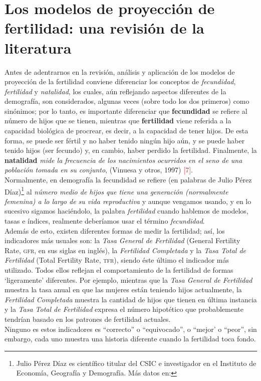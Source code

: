 \section{Los modelos de proyección de fertilidad: una revisión de la literatura} %

Antes de adentrarnos en la revisión, análisis y aplicación de los modelos de proyección de la fertilidad conviene diferenciar los conceptos de \textit{fecundidad}, \textit{fertilidad} y \textit{natalidad}, los cuales, aún reflejando aspectos diferentes de la demografía, son considerados, algunas veces (sobre todo los dos primeros) como sinónimos; por lo tanto, es importante diferenciar que \textbf{fecundidad} se refiere al número de hijos que se tienen, mientras que \textbf{fertilidad} viene referida a la capacidad biológica de procrear, es decir, a la capacidad de tener hijos. De esta forma, se puede ser fértil y no haber tenido ningún hijo aún, y se puede haber tenido hijos (ser fecundo) y, en cambio, haber perdido la fertilidad. Finalmente, la \textbf{natalidad} \textit{mide la frecuencia de los nacimientos ocurridos en el seno de una población tomada en su conjunto}, (Vinuesa y otros, 1997) \textcolor{red}{[7]}.\\
Normalmente, en demografía la fecundidad se refiere (en palabras de Julio Pérez Díaz)\footnote{Julio Pérez Díaz es científico titular del CSIC e investigador en el Instituto de Economía, Geografía y Demografía. Más datos en: \texttt{}} al \textit{número medio de hijos que tiene una generación (normalmente femenina) a lo largo de su vida reproductiva} y aunque vengamos usando, y en lo sucesivo sigamos haciéndolo, la palabra \textit{fertilidad} cuando hablemos de modelos, tasas e índices, realmente deberíamos usar el término \textit{fecundidad}.\\

Además de esto, existen diferentes formas de medir la fertilidad; así, los indicadores más usuales son: la \textit{Tasa General de Fertilidad} (General Fertility Rate, \textsc{gfr}, en sus siglas en inglés), la \textit{Fertilidad Completada} y la \textit{Tasa Total de Fertilidad} (Total Fertility Rate, \textsc{tfr}), siendo éste último el indicador más utilizado. Todos ellos reflejan el comportamiento de la fertilidad de formas `ligeramente' diferentes. Por ejemplo, mientras que la \textit{Tasa General de Fertilidad} muestra la tasa anual en que las mujeres están teniendo hijos actualmente, la \textit{Fertilidad Completada} muestra la cantidad de hijos que tienen en última instancia y la  \textit{Tasa Total de Fertilidad} expresa el número hipotético que probablemente tendrían basado en los patrones de fertilidad actuales.\\
Ninguno es estos indicadores es ``correcto'' o ``equivocado'', o ``mejor' o ``peor'', sin embargo, cada uno muestra una historia diferente cuando la fertilidad toca fondo.\\

